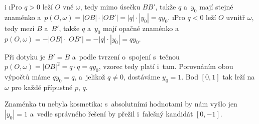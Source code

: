{    \begitems \style i
    \i Pro $q>0$ leží $O$ vně $\omega$, tedy mimo úsečku $BB'$, takže $q$ a~$y_0$ mají stejné znaménko a~$p(O,\omega)=|OB| \cdot |OB'|=|q| \cdot |y_0|=qy_0$.
    \i Pro $q<0$ leží $O$ uvnitř $\omega$, tedy mezi $B$ a~$B'$, takže $q$ a~$y_0$ mají opačné znaménko a~$p(O,\omega)=-|OB| \cdot |OB'|=-|q| \cdot |y_0|=qy_0$.
    \enditems

    Při dotyku je $B'=B$ a~podle tvrzení o~spojení s~tečnou $p(O,\omega)=|OB|^2=q \cdot q=qy_0$, vzorec tedy platí i~tam. Porovnáním obou výpočtů máme $qy_0=q$, a~jelikož $q \neq 0$, dostáváme $y_0=1$. Bod $[0,1]$ tak leží na $\omega$ pro každé přípustné $p$, $q$.

    Znaménka tu nebyla kosmetika: s~absolutními hodnotami by nám vyšlo jen $|y_0|=1$ a~vedle správného řešení by přežil i~falešný kandidát $[0,-1]$.
}

